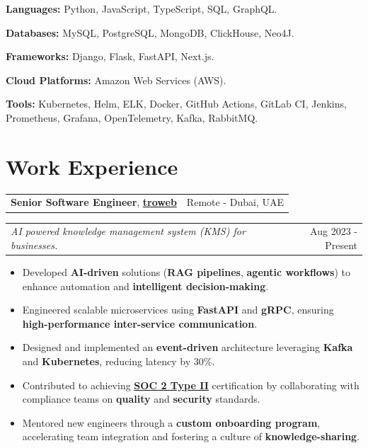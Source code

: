 \documentclass[letterpaper,11pt]{article}
\makeatletter
\newcommand{\resumeItemSimple}[1]{
  \item\small{
    {#1}
  }
}
\newcommand{\resumeSubheadingSimple}[5]{
    \begin{tabular*}{1\textwidth}[t]{l@{\extracolsep{\fill}}r}
      \textbf{#1}, \textbf{\href{#3}{#2}} \space \small#4 & \small#5 \\
    \end{tabular*}
}
\newcommand{\resumeSubSubheading}[2]{
    \begin{tabular*}{1\textwidth}{l@{\extracolsep{\fill}}r}
      \textit{\small#1} & \small #2 \\
    \end{tabular*}\vspace{-1pt}
}
\newcommand{\resumeItemListStart}{\begin{itemize}[leftmargin=0.5cm, itemsep=1pt, parsep=0pt]} %
\newcommand{\resumeItemListEnd}{\end{itemize}}
\newcommand{\skillItem}[2]{
  \textbf{#1:} #2 \\ {\vspace{3px}}
}
\makeatother
\begin{document}
  \skillItem{Languages}{Python, JavaScript, TypeScript, SQL, GraphQL.}
  \skillItem{Databases}{MySQL, PostgreSQL, MongoDB, ClickHouse, Neo4J.}
  \skillItem{Frameworks}{Django, Flask, FastAPI, Next.js.}
  \skillItem{Cloud Platforms}{Amazon Web Services (AWS).}
  \skillItem{Tools}{Kubernetes, Helm, ELK, Docker, GitHub Actions, GitLab CI, Jenkins, Prometheus, Grafana, OpenTelemetry, Kafka, RabbitMQ.}

\section{Work Experience}

  \resumeSubheadingSimple
    {Senior Software Engineer}{troweb}{https://www.linkedin.com/company/troweb/}{}{Remote - Dubai, UAE}
    \resumeSubSubheading{AI powered knowledge management system (KMS) for businesses.}{Aug 2023 - Present}
    \resumeItemListStart
      \resumeItemSimple{Developed \textbf{AI-driven} solutions (\textbf{RAG pipelines}, \textbf{agentic workflows}) to enhance automation and \textbf{intelligent decision-making}.}
      \resumeItemSimple{Engineered scalable microservices using \textbf{FastAPI} and \textbf{gRPC}, ensuring \textbf{high-performance inter-service communication}.}
      \resumeItemSimple{Designed and implemented an \textbf{event-driven} architecture leveraging \textbf{Kafka} and \textbf{Kubernetes}, reducing latency by 30\%.}
      \resumeItemSimple{Contributed to achieving \href{https://sprinto.com/blog/soc-2-type-2/}{\textbf{SOC 2 Type II}} certification by collaborating with compliance teams on \textbf{quality} and \textbf{security} standards.}
      \resumeItemSimple{Mentored new engineers through a \textbf{custom onboarding program}, accelerating team integration and fostering a culture of \textbf{knowledge-sharing}.}
    \resumeItemListEnd
\end{document}
